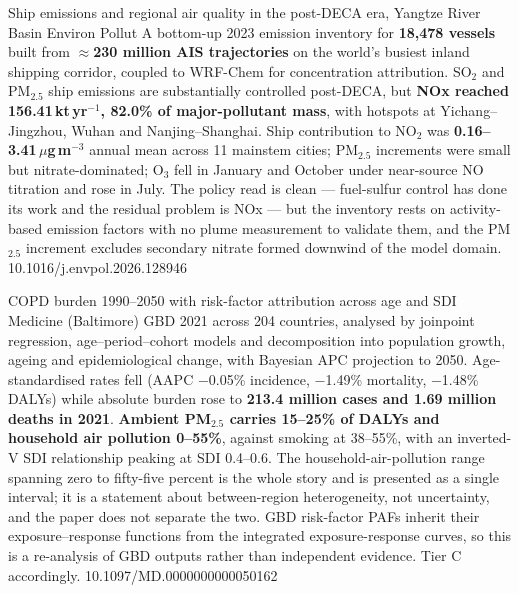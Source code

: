 \documentclass[10pt]{article}
\begin{document}
{Ship emissions and regional air quality in the post-DECA era, Yangtze River Basin}
{Environ Pollut}
{A bottom-up 2023 emission inventory for \textbf{18{,}478 vessels} built from
\textbf{$\approx$230 million AIS trajectories} on the world's busiest inland shipping
corridor, coupled to WRF-Chem for concentration attribution. SO$_2$ and PM$_{2.5}$ ship
emissions are substantially controlled post-DECA, but \textbf{NOx reached
156.41\,kt\,yr$^{-1}$, 82.0\% of major-pollutant mass}, with hotspots at
Yichang--Jingzhou, Wuhan and Nanjing--Shanghai. Ship contribution to NO$_2$ was
\textbf{0.16--3.41\,$\mu$g\,m$^{-3}$} annual mean across 11 mainstem cities; PM$_{2.5}$
increments were small but nitrate-dominated; O$_3$ fell in January and October under
near-source NO titration and rose in July. The policy read is clean --- fuel-sulfur control
has done its work and the residual problem is NOx --- but the inventory rests on activity-based
emission factors with no plume measurement to validate them, and the PM$_{2.5}$ increment
excludes secondary nitrate formed downwind of the model domain.}
{10.1016/j.envpol.2026.128946}

{COPD burden 1990--2050 with risk-factor attribution across age and SDI}
{Medicine (Baltimore)}
{GBD 2021 across 204 countries, analysed by joinpoint regression, age--period--cohort
models and decomposition into population growth, ageing and epidemiological change, with
Bayesian APC projection to 2050. Age-standardised rates fell (AAPC $-$0.05\% incidence,
$-$1.49\% mortality, $-$1.48\% DALYs) while absolute burden rose to \textbf{213.4 million
cases and 1.69 million deaths in 2021}. \textbf{Ambient PM$_{2.5}$ carries 15--25\% of
DALYs and household air pollution 0--55\%}, against smoking at 38--55\%, with an inverted-V
SDI relationship peaking at SDI 0.4--0.6. The household-air-pollution range spanning zero
to fifty-five percent is the whole story and is presented as a single interval; it is a
statement about between-region heterogeneity, not uncertainty, and the paper does not
separate the two. GBD risk-factor PAFs inherit their exposure--response functions from the
integrated exposure-response curves, so this is a re-analysis of GBD outputs rather than
independent evidence. Tier C accordingly.}
{10.1097/MD.0000000000050162}

\end{document}
